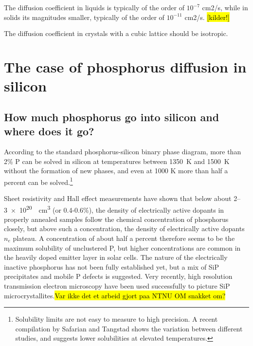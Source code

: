 \documentclass[11pt,bibliography=totoc,index=totoc]{scrbook}   %
\newcommand{\comment}[1]{\hl{#1}}
\begin{document}
The diffusion coefficient in liquids is typically of the order of $10^{-7}$ cm2/s,
while in solids its magnitudes smaller, typically of the order of $10^{-11}$ cm2/s. \comment{[kilder!]}


The diffusion coefficient in crystals with a cubic lattice should be isotropic.

%
\section{The case of phosphorus diffusion in silicon}\label{sec:PinSi}
%

%
\subsection{How much phosphorus go into silicon and where does it go?}
%

According to the standard phosphorus-silicon binary phase diagram,\cite{PSiPhaseDiagram} more than 2\% P can be solved in silicon at temperatures between \SI{1350}{\kelvin} and \SI{1500}{\kelvin} without the formation of new phases, and even at 1000 K more than half a percent can be solved.\footnote{Solubility limits are not easy to measure to high precision. A recent compilation by Safarian and Tangstad shows the variation between different studies, and suggests lower solubilities at elevated temperatures.\cite{Safarian:2011}}

Sheet resistivity and Hall effect measurements have shown that below about 2–\SI{3e20}{\per\centi\metre\cubed} (or 0.4-0.6\%), the density of electrically active dopants in properly annealed samples follow the chemical concentration of phosphorus closely, but above such a concentration, the density of electrically active dopants $n_e$ plateau.\cite{Tannenbaum:1961}
A concentration of about half a percent therefore seems to be the maximum solubility of unclustered P,\cite{Solmi:1998} but higher concentrations
are common in the heavily doped emitter layer in solar cells.\cite{Bentzen:2006b}
The nature of the electrically inactive phosphorus has not been fully established yet, but a mix of SiP precipitates and mobile P defects is suggested.\cite{Armigliato:1976}\cite{Solmi:1996} 
Very recently, high resolution transmission electron microscopy have been used successfully to picture SiP microcrystallites.\comment{Var ikke det et arbeid gjort paa NTNU OM snakket om?}
\end{document}

